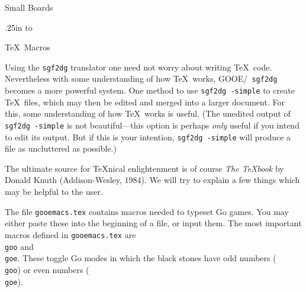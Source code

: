 \centerline{\titlefont Small Boards}
\vglue.25in
\hbox to

\vfil\eject

\centerline{\titlefont\TeX\ Macros}

\bigbreak
Using the {\tt sgf2dg} translator one need not worry about writing \TeX\
code. Nevertheless with some understanding of how \TeX\ works, GOOE/{\tt
sgf2dg} becomes a more powerful system. One method to use {\tt sgf2dg
-simple} to create \TeX\ files, which may then be edited and merged into a
larger document. For this, some understanding of how \TeX\ works is useful.
(The unedited output of {\tt sgf2dg -simple} is not beautiful---this 
option is perhaps {\it only} useful if you intend to edit its output.
But if this is your intention, {\tt sgf2dg -simple} will produce a file
as uncluttered as possible.)

The ultimate source for \TeX nical enlightenment is of course
{\it The \TeX book} by Donald Knuth (Addison-Wesley, 1984). We will try
to explain a few things which may be helpful to the user.

The file {\tt gooemacs.tex} contains macros needed to typeset Go games. You
may either paste these into the beginning of a file, or input them. 
The most important macros defined in {\tt gooemacs.tex} are {\tt \\goo} and
{\tt\\goe}. These toggle Go modes in which the black stones have odd numbers
({\tt \\goo}) or even numbers ({\tt \\goe}).

